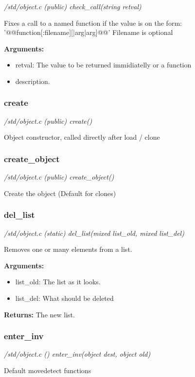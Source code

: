 {\em /std/object.c (public) check\_call(string retval)}

Fixes a call to a named function if the value is on the form:
'@@function[:filename][|arg|arg]@@' Filename is optional

{\bf Arguments:}
\begin{itemize}
\item      retval: The value to be returned immidiatelly or a function
\item description.
\end{itemize}


\subsubsection{create}

{\em /std/object.c (public) create()}

Object constructor, called directly after load / clone


\subsubsection{create\_object}

{\em /std/object.c (public) create\_object()}

Create the object (Default for clones)


\subsubsection{del\_list}

{\em /std/object.c (static) del\_list(mixed list\_old, mixed list\_del)}

Removes one or many elements from a list.

{\bf Arguments:}
\begin{itemize}
\item     list\_old: The list as it looks.
\item list\_del: What should be deleted
\end{itemize}

{\bf Returns:}    The new list.


\subsubsection{enter\_inv}

{\em /std/object.c () enter\_inv(object dest, object old)}

Default movedetect functions


